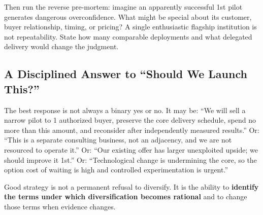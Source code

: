 Then run the reverse pre-mortem: imagine an apparently successful 1st pilot generates dangerous overconfidence. What might be special about its customer, buyer relationship, timing, or pricing? A single enthusiastic flagship institution is not repeatability. State how many comparable deployments and what delegated delivery would change the judgment.

\subsection{A Disciplined Answer to ``Should We Launch This?''}
\label{sec:disciplined_answer_should_we_launch}

The best response is not always a binary yes or no. It may be: ``We will sell a narrow pilot to 1 authorized buyer, preserve the core delivery schedule, spend no more than this amount, and reconsider after independently measured results.'' Or: ``This is a separate consulting business, not an adjacency, and we are not resourced to operate it.'' Or: ``Our existing offer has larger unexploited upside; we should improve it 1st.'' Or: ``Technological change is undermining the core, so the option cost of waiting is high and controlled experimentation is urgent.''

Good strategy is not a permanent refusal to diversify. It is the ability to \textbf{identify the terms under which diversification becomes rational} and to change those terms when evidence changes.

